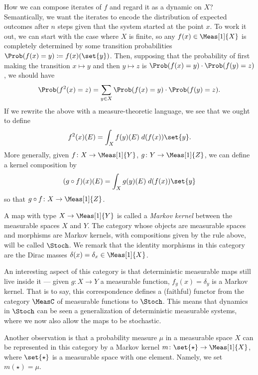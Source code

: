 \documentclass[../main]{subfiles}
\begin{document}
How we can compose iterates of \(f\) and regard it as a dynamic on \(X\)? Semantically, we want the iterates to encode the distribution of expected outcomes after \(n\) steps given that the system started at the point \(x\). To work it out, we can start with the case where \(X\) is finite, so any \(f(x)\in \Meas[1]{X}\) is completely determined by some transition probabilities \(\Prob(f(x) = y) \coloneqq f(x)(\set{y})\). Then, supposing that the probability of first making the transition \(x \mapsto y\) and then \(y \mapsto z\) is \(\Prob(f(x) = y)\cdot \Prob(f(y) = z)\), we should have
\[\displaystyle\Prob(f^2(x) = z) = \sum_{y \in X} \Prob(f(x) = y)\cdot \Prob(f(y) = z).\]
If we rewrite the above with a measure-theoretic language, we see that we ought to define
\begin{equation*}
  f^2(x)(E) = \int_X f(y)(E) \;d (f(x))\set{y}.
\end{equation*}
More generally, given \(f \colon X \to \Meas[1]{Y}\),  \(g \colon Y \to \Meas[1]{Z}\), we can define a kernel composition by
\begin{equation*}
  (g \circ f)(x)(E) = \int_X g(y)(E)\;d(f(x))\set{y}
\end{equation*}
so that \(g \circ f \colon X \to \Meas[1]{Z}\).

A map with type \(X \to \Meas[1]{Y}\) is called a \emph{Markov kernel} between the measurable spaces \(X\) and \(Y\). The category whose objects are measurable spaces and morphisms are Markov kernels, with compositions given by the rule above, will be called \(\Stoch\). We remark that the identity morphisms in this category are the Dirac masses \(\delta(x) = \delta_x \in \Meas[1]{X}\).

An interesting aspect of this category is that deterministic measurable maps still live inside it --- given \(g \colon X \to Y\) a measurable function, \(f_g(x) = \delta_y\) is a Markov kernel. That is to say, this correspondence defines a (faithful) functor from the category \(\MeasC\) of measurable functions to \(\Stoch\). This means that dynamics in \(\Stoch\) can be seen a generalization of deterministic measurable systems, where we now also allow the maps to be stochastic.

Another observation is that a probability measure \(\mu\) in a measurable space \(X\) can be represented in this category by a Markov kernel \(m \colon \set{\star} \to \Meas[1]{X}\), where \(\set{\star}\) is a measurable space with one element. Namely, we set \(m(\star) = \mu\).

\end{document}
